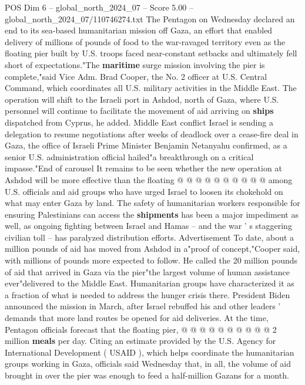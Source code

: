 \begin{textsample}{POS Dim 6 – global\_north\_2024\_07 – Score 5.00 – global\_north\_2024\_07/110746274.txt}  \label{ex:f6_pos_238}
The Pentagon on Wednesday declared an end to its sea-based humanitarian mission off Gaza, an effort that enabled delivery of millions of pounds of food to the war-ravaged territory even as the floating pier built by U.S. troops faced near-constant setbacks and ultimately fell short of expectations."The \textbf{maritime} surge mission involving the pier is complete,"said Vice Adm.
Brad Cooper, the No. 2 officer at U.S.
Central Command, which coordinates all U.S. military activities in the Middle East.
The operation will shift to the Israeli port in Ashdod, north of Gaza, where U.S. personnel will continue to facilitate the movement of aid arriving on \textbf{ships} dispatched from Cyprus, he added.
Middle East conflict Israel is sending a delegation to resume negotiations after weeks of deadlock over a cease-fire deal in Gaza, the office of Israeli Prime Minister Benjamin Netanyahu confirmed, as a senior U.S. administration official hailed"a breakthrough on a critical impasse."End of carousel It remains to be seen whether the new operation at Ashdod will be more effective than the floating @ @ @ @ @ @ @ @ @ @ among U.S. officials and aid groups who have urged Israel to loosen its chokehold on what may enter Gaza by land.
The safety of humanitarian workers responsible for ensuring Palestinians can access the \textbf{shipments} has been a major impediment as well, as ongoing fighting between Israel and Hamas -- and the war ' s staggering civilian toll -- has paralyzed distribution efforts.
Advertisement To date, about a million pounds of aid has moved from Ashdod in a"proof of concept,"Cooper said, with millions of pounds more expected to follow.
He called the 20 million pounds of aid that arrived in Gaza via the pier"the largest volume of human assistance ever"delivered to the Middle East.
Humanitarian groups have characterized it as a fraction of what is needed to address the hunger crisis there.
President Biden announced the mission in March, after Israel rebuffed his and other leaders ' demands that more land routes be opened for aid deliveries.
At the time, Pentagon officials forecast that the floating pier, @ @ @ @ @ @ @ @ @ @ 2 million \textbf{meals} per day.
Citing an estimate provided by the U.S.
Agency for International Development ( USAID ), which helps coordinate the humanitarian groups working in Gaza, officials said Wednesday that, in all, the volume of aid brought in over the pier was enough to feed a half-million Gazans for a month.

\end{textsample}

